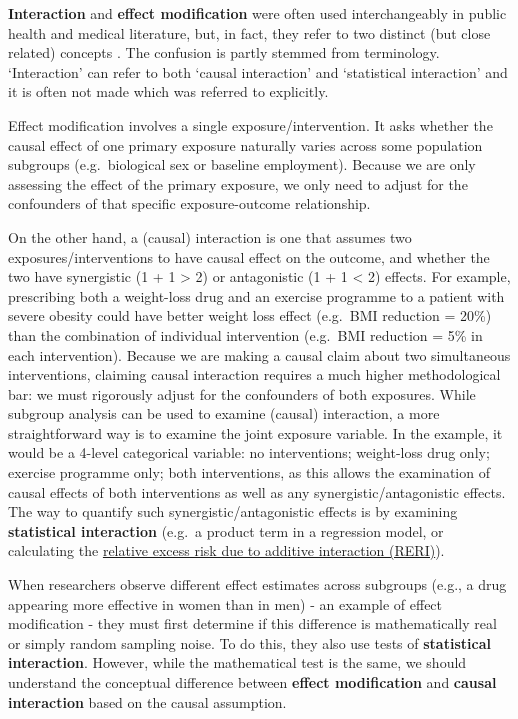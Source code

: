 \documentclass[
]{book}
\begin{document}
\textbf{Interaction} and \textbf{effect modification} were often used interchangeably in public health and medical literature, but, in fact, they refer to two distinct (but close related) concepts \citep{vanderweele2009distinction}. The confusion is partly stemmed from terminology. `Interaction' can refer to both `causal interaction' and `statistical interaction' and it is often not made which was referred to explicitly.

Effect modification involves a single exposure/intervention. It asks whether the causal effect of one primary exposure naturally varies across some population subgroups (e.g.~biological sex or baseline employment). Because we are only assessing the effect of the primary exposure, we only need to adjust for the confounders of that specific exposure-outcome relationship.

On the other hand, a (causal) interaction is one that assumes two exposures/interventions to have causal effect on the outcome, and whether the two have synergistic (1 + 1 \textgreater{} 2) or antagonistic (1 + 1 \textless{} 2) effects. For example, prescribing both a weight-loss drug and an exercise programme to a patient with severe obesity could have better weight loss effect (e.g.~BMI reduction = 20\%) than the combination of individual intervention (e.g.~BMI reduction = 5\% in each intervention). Because we are making a causal claim about two simultaneous interventions, claiming causal interaction requires a much higher methodological bar: we must rigorously adjust for the confounders of both exposures. While subgroup analysis can be used to examine (causal) interaction, a more straightforward way is to examine the joint exposure variable. In the example, it would be a 4-level categorical variable: no interventions; weight-loss drug only; exercise programme only; both interventions, as this allows the examination of causal effects of both interventions as well as any synergistic/antagonistic effects. The way to quantify such synergistic/antagonistic effects is by examining \textbf{statistical interaction} (e.g.~a product term in a regression model, or calculating the \hyperref[acronyms_RERI]{relative excess risk due to additive interaction (RERI)}).

When researchers observe different effect estimates across subgroups (e.g., a drug appearing more effective in women than in men) - an example of effect modification - they must first determine if this difference is mathematically real or simply random sampling noise. To do this, they also use tests of \textbf{statistical interaction}. However, while the mathematical test is the same, we should understand the conceptual difference between \textbf{effect modification} and \textbf{causal interaction} based on the causal assumption.
\end{document}
